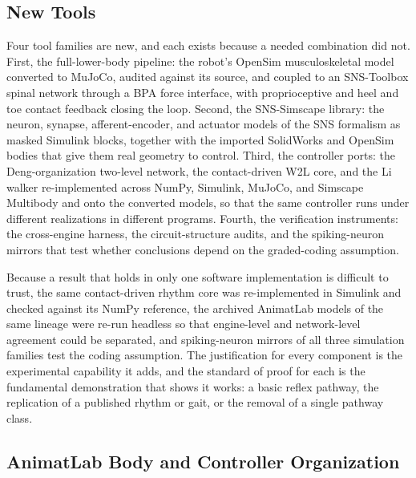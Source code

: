 \subsection{New Tools}\label{sec:sns_new_tools}

Four tool families are new, and each exists because a needed combination did not. First, the full-lower-body pipeline: the robot's OpenSim musculoskeletal model converted to MuJoCo, audited against its source, and coupled to an SNS-Toolbox spinal network through a BPA force interface, with proprioceptive and heel and toe contact feedback closing the loop. Second, the SNS-Simscape library: the neuron, synapse, afferent-encoder, and actuator models of the SNS formalism as masked Simulink blocks, together with the imported SolidWorks and OpenSim bodies that give them real geometry to control. Third, the controller ports: the Deng-organization two-level network, the contact-driven W2L core, and the Li walker re-implemented across NumPy, Simulink, MuJoCo, and Simscape Multibody and onto the converted models, so that the same controller runs under different realizations in different programs. Fourth, the verification instruments: the cross-engine harness, the circuit-structure audits, and the spiking-neuron mirrors that test whether conclusions depend on the graded-coding assumption.

Because a result that holds in only one software implementation is difficult to trust, the same contact-driven rhythm core was re-implemented in Simulink and checked against its NumPy reference, the archived AnimatLab models of the same lineage were re-run headless so that engine-level and network-level agreement could be separated, and spiking-neuron mirrors of all three simulation families test the coding assumption. The justification for every component is the experimental capability it adds, and the standard of proof for each is the fundamental demonstration that shows it works: a basic reflex pathway, the replication of a published rhythm or gait, or the removal of a single pathway class.

\subsection{AnimatLab Body and Controller Organization}

